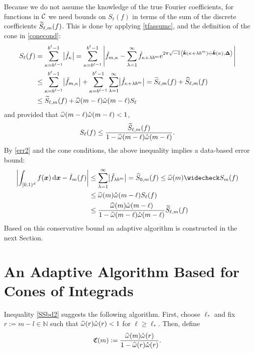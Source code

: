 \documentclass[graybox]{svmult}
\newcommand{\N}{\mathbb{N}} %
\newcommand{\bsx}{\boldsymbol{x}}    %
\newcommand{\bsDelta}{\boldsymbol{\Delta}}    %
\begin{document}
Because we do not assume the knowledge of the true  Fourier  coefficients, for functions in $\mathcal{C}$ we need bounds on $S_{\ell}(f)$ in terms of the sum of the discrete coefficients $\widetilde{S}_{\ell,m}(f)$.  This is done by applying \eqref{tfassumc},  and the definition of the cone in \eqref{conecond}:
\begin{align}
\nonumber
S_\ell(f) &= \sum_{\kappa=b^{\ell-1}}^{b^{\ell}-1} \bigl \lvert \hf_{\kappa}\bigr\rvert= \sum_{\kappa=b^{\ell-1}}^{b^{\ell}-1} \abs{\tf_{m,\kappa} - \sum_{\lambda=1}^{\infty} \hf_{\kappa+\lambda b^{m}} \E^{2 \pi \sqrt{-1} \ip{\tvk(\kappa+\lambda b^{m}) \ominus \tvk(\kappa)}{\bsDelta}}}\\
\nonumber
&\le \sum_{\kappa=b^{\ell-1}}^{b^{\ell}-1} \bigl \lvert \tf_{m,\kappa} \bigr\rvert + \sum_{\kappa=b^{\ell-1}}^{b^{\ell}-1} \sum_{\lambda=1}^{\infty} \bigl \lvert \hf_{\kappa+\lambda b^{m}}\bigr\rvert = \tS_{\ell,m}(f) + \hS_{\ell,m}(f) \\
\label{boundSumbsApproxa}
&\le \tS_{\ell,m}(f) + \homega(m-\ell) \wcomega(m-\ell) S_\ell\
\end{align}
and provided that $\widehat{\omega}(m-\ell) \mathring{\omega}(m-\ell)<1$,
\begin{equation}\label{boundSumsApproxb}
S_\ell(f) \le \frac{\tS_{\ell,m}(f)}{1 - \homega(m-\ell) \wcomega(m-\ell)}.
\end{equation}
By \eqref{err2} and the cone conditions, the above inequality implies a data-based error bound:
\begin{align}
\nonumber
\biggabs{\int_{\cube} f(\bsx) \, \D \bsx - \hI_m(f) }
&\le \sum_{\lambda=1}^{\infty} \bigabs{\hf_{\lambda b^{m}}} 
= \hS_{0,m}(f)\le \homega(m) \wcS_m(f)\\
\nonumber
&  \le \homega(m) \wcomega(m-\ell) S_\ell(f)\\
& \le  \frac{\homega(m) \wcomega(m-\ell)}{1 - \homega(m-\ell) \wcomega(m-\ell)}\tS_{\ell,m}(f)
\label{SSbd2}
\end{align}
Based on this conservative bound an adaptive algorithm is constructed in the next Section. 

\section{An Adaptive Algorithm Based for Cones of Integrads}\label{algorithmsection}

Inequality \eqref{SSbd2} suggests the following algorithm. First, choose $\ell_*$ and fix $r:=m-l \in \N$ such that $\widehat{\omega}(r)\mathring{\omega}(r)<1$ for $\ell\geq\ell_*$. Then, define
\[
\mathfrak{C}(m):= \frac{\widehat{\omega}(m) \mathring{\omega}(r)}{1 - \widehat{\omega}(r) \mathring{\omega}(r)}.
\]
\end{document}
